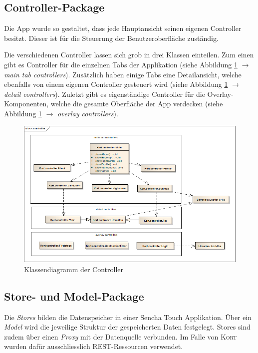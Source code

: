 \subsection{Controller-Package}

Die App wurde so gestaltet, dass jede Hauptansicht seinen eigenen Controller besitzt.
Dieser ist für die Steuerung der Benutzeroberfläche zuständig.

Die verschiedenen Controller lassen sich grob in drei Klassen einteilen.
Zum einen gibt es Controller für die einzelnen Tabs der Applikation (siehe Abbildung \ref{image-kort-classdiagram-controller} $\rightarrow$ \emph{main tab controllers}).
Zusätzlich haben einige Tabs eine Detailansicht, welche ebenfalls von einem eigenen Controller gesteuert wird (siehe Abbildung \ref{image-kort-classdiagram-controller} $\rightarrow$ \emph{detail controllers}).
Zuletzt gibt es eigenständige Controller für die Overlay-Komponenten, welche die gesamte Oberfläche der App verdecken (siehe Abbildung \ref{image-kort-classdiagram-controller} $\rightarrow$ \emph{overlay controllers}).

\begin{figure}[H]
	\centering
	\includegraphics[width=\textwidth]{images/uml/kort-classdiagram-controller}
	\caption{Klassendiagramm der Controller}
	\label{image-kort-classdiagram-controller}
\end{figure}

\subsection{Store- und Model-Package}
\label{kort-store-model-package}

Die \emph{Stores} bilden die Datenspeicher in einer Sencha Touch Applikation.
Über ein \emph{Model} wird die jeweilige Struktur der gespeicherten Daten festgelegt.
Stores sind zudem über einen \emph{Proxy} mit der Datenquelle verbunden.
Im Falle von \textsc{Kort} wurden dafür ausschliesslich REST-Ressourcen verwendet.

